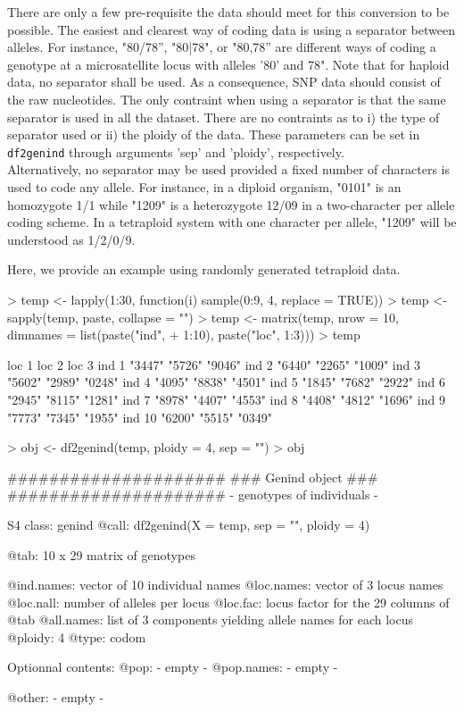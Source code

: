 \documentclass{article}
\begin{document}
There are only a few pre-requisite the data should meet for this conversion to be possible. The
easiest and clearest way of coding data is using a separator between alleles. For instance,
"80/78'', "80|78", or "80,78'' are different ways of coding a genotype at a microsatellite locus
with alleles '80' and 78".
Note that for haploid data, no separator shall be used.
As a consequence, SNP data should consist of the raw nucleotides.
The only contraint when using a separator is that the same separator is used in all the
dataset. There are no contraints as to i) the type of separator used or ii) the ploidy of the data.
These parameters can be set in \texttt{df2genind} through arguments 'sep' and 'ploidy', respectively.
\\

Alternatively, no separator may be used provided a fixed number of characters is used to code any allele.
For instance, in a diploid organism, "0101" is an homozygote 1/1 while "1209" is a heterozygote
12/09 in a two-character per allele coding scheme.
In a tetraploid system with one character per allele, "1209" will be understood as 1/2/0/9.

Here, we provide an example using randomly generated tetraploid data.
\begin{Schunk}
\begin{Sinput}
> temp <- lapply(1:30, function(i) sample(0:9, 4, replace = TRUE))
> temp <- sapply(temp, paste, collapse = "")
> temp <- matrix(temp, nrow = 10, dimnames = list(paste("ind", 
+     1:10), paste("loc", 1:3)))
> temp
\end{Sinput}
\begin{Soutput}
       loc 1  loc 2  loc 3 
ind 1  "3447" "5726" "9046"
ind 2  "6440" "2265" "1009"
ind 3  "5602" "2989" "0248"
ind 4  "4095" "8838" "4501"
ind 5  "1845" "7682" "2922"
ind 6  "2945" "8115" "1281"
ind 7  "8978" "4407" "4553"
ind 8  "4408" "4812" "1696"
ind 9  "7773" "7345" "1955"
ind 10 "6200" "5515" "0349"
\end{Soutput}
\begin{Sinput}
> obj <- df2genind(temp, ploidy = 4, sep = "")
> obj
\end{Sinput}
\begin{Soutput}
   #####################
   ### Genind object ### 
   #####################
- genotypes of individuals - 

S4 class:  genind
@call: df2genind(X = temp, sep = "", ploidy = 4)

@tab:  10 x 29 matrix of genotypes

@ind.names: vector of  10 individual names
@loc.names: vector of  3 locus names
@loc.nall: number of alleles per locus
@loc.fac: locus factor for the  29 columns of @tab
@all.names: list of  3 components yielding allele names for each locus
@ploidy:  4
@type:  codom

Optionnal contents: 
@pop:  - empty -
@pop.names:  - empty -

@other: - empty -
\end{Soutput}
\end{Schunk}
\end{document}
